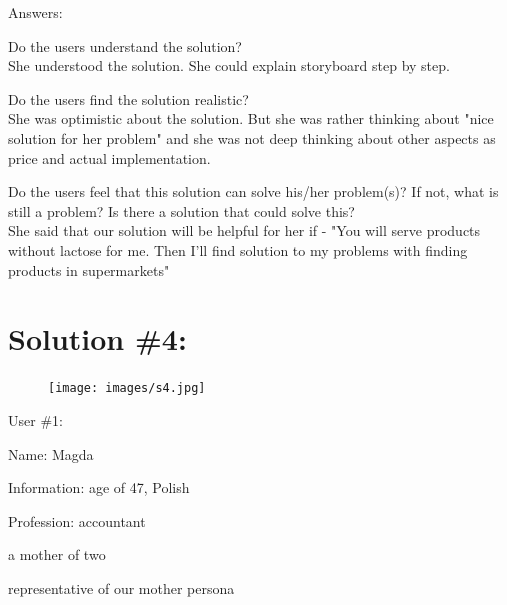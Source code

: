 \documentclass[a4paper,10pt,oneside]{scrreprt}
\begin{document}
Answers:
\begin{compactitem}
	\item Do the users understand the solution?\\
	She understood the solution. She could explain storyboard step by step.\\

	\item Do the users find the solution realistic?\\
	She was optimistic about the solution. But she was rather thinking about "nice solution for her problem" and she was not deep thinking about other aspects as price and actual implementation.\\

	\item Do the users feel that this solution can solve his/her problem(s)? If not, what is still
	a problem? Is there a solution that could solve this?\\
	She said that our solution will be helpful for her if - "You will serve products without lactose for me. Then I'll find solution to my problems with finding products in supermarkets"\\
\end{compactitem}

\clearpage
\section{Solution \#4:}
\begin{figure}[h]
	\centering
	\texttt{[image: images/s4.jpg]}
\end{figure}
User \#1:
\begin{compactitem}
	\item Name: Magda
	\item Information: age of 47, Polish
	\item Profession: accountant 
	\item a mother of two
	\item representative of our mother persona 
\end{compactitem}
\bigskip
\end{document}
